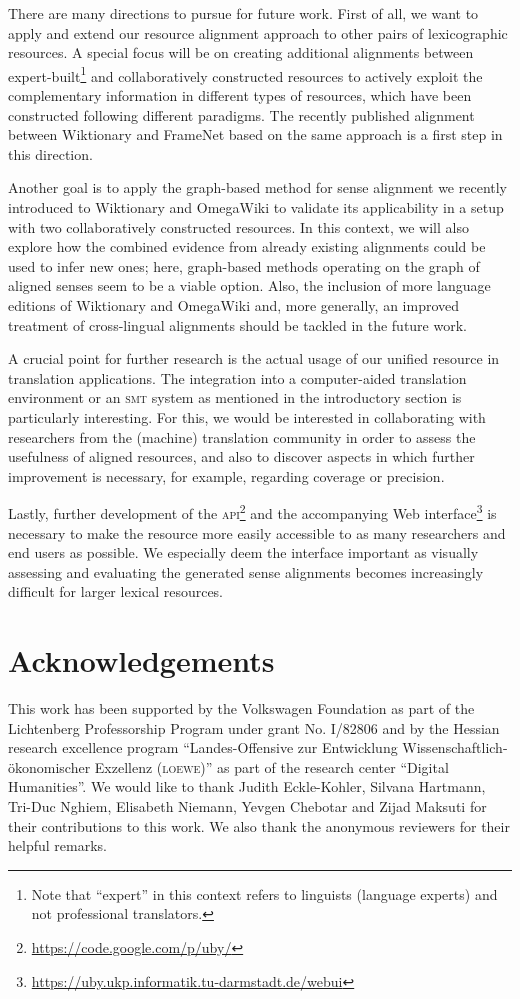 \documentclass[output=paper]{LSP/langsci}
\begin{document}
There are many directions to pursue for future work. First of all, we want to apply and extend our resource alignment approach to other pairs of lexicographic resources. A special focus will be on creating additional alignments between expert-built\footnote{Note that ``expert'' in this context refers to linguists (language experts) and not professional translators.} and collaboratively constructed resources to actively exploit the complementary information in different types of resources, which have been constructed following different paradigms. The recently published alignment between Wiktionary and FrameNet based on the same approach \citep{TUD-CS-2013-0082} is a first step in this direction.

Another goal is to apply the graph-based method for sense alignment we recently introduced \citep{TUD-CS-2013-0057} to Wiktionary and OmegaWiki to validate its applicability in a setup with two collaboratively constructed resources. In this context, we will also explore how the combined evidence from already existing alignments could be used to infer new ones; here, graph-based methods operating on the graph of aligned senses seem to be a viable option. Also, the inclusion of more language editions of Wiktionary and OmegaWiki and, more generally, an improved treatment of cross-lingual alignments  should be tackled in the future work.

A crucial point for further research is the actual usage of our unified resource in translation applications. The integration into a computer-aided translation environment or an \textsc{smt} system as mentioned in the introductory section is particularly interesting. For this, we would be interested in collaborating with researchers from the (machine) translation community in order to assess the usefulness of aligned resources, and also to discover aspects in which further improvement is necessary, for example, regarding coverage or precision.

Lastly, further development of the \textsc{api}\footnote{\url{https://code.google.com/p/uby/}} and the accompanying Web interface\footnote{\url{https://uby.ukp.informatik.tu-darmstadt.de/webui}} is necessary to make the resource more easily accessible to as many researchers and end users as possible. We especially deem the interface important as visually assessing and evaluating the generated sense alignments becomes increasingly difficult for larger lexical resources.

\section*{Acknowledgements}
This work has been supported by the Volkswagen Foundation as part of the Lichtenberg Professorship Program under grant No. I/82806 and by the Hessian research excellence program ``Landes-Offensive zur Entwicklung Wissenschaftlich-\"{o}konomischer Exzellenz (\textsc{loewe})'' as part of the research center ``Digital Humanities''. We would like to thank Judith Eckle-Kohler, Silvana Hartmann, Tri-Duc Nghiem, Elisabeth Niemann, Yevgen Chebotar and Zijad Maksuti for their contributions to this work. We also thank the anonymous reviewers for their helpful remarks.


\sloppy
\printbibliography[heading=subbibliography,notkeyword=this]
\end{document}
